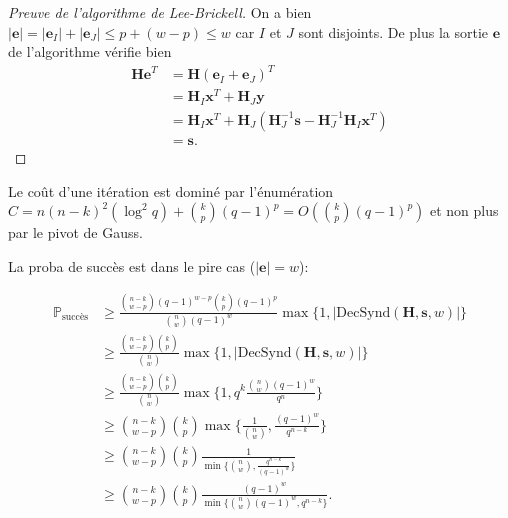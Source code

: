 \documentclass{scrartcl}[a4paper,9pt,headings=small,footinclude=false]
\theoremstyle{definition}
\theoremstyle{remark}
\begin{document}
\begin{proof}[Preuve de l'algorithme de Lee-Brickell]
On a bien $|\textbf{e}|=|\textbf{e}_I|+|\textbf{e}_J|\leq p + (w - p)\leq w$ car $I$ et $J$ sont disjoints.
De plus la sortie $\textbf{e}$ de l'algorithme vérifie bien
\begin{align*}
    \textbf{He}^T &= \textbf{H}(\textbf{e}_I+\textbf{e}_J)^T\\
    &= \textbf{H}_I \textbf{x}^T + \textbf{H}_J \textbf{y}\\
    &= \textbf{H}_I \textbf{x}^T + \textbf{H}_J (\textbf{H}_J^{-1}\textbf{s} - \textbf{H}_J^{-1}\textbf{H}_I\textbf{x}^T)\\
    &= \textbf{s}.
\end{align*}
\end{proof}

Le coût d'une itération est dominé par l'énumération $C=n(n-k)^2(\log^2 q) + \binom{k}{p}(q-1)^p=O(\binom{k}{p}(q-1)^p)$ et non plus par le pivot de Gauss. 


La proba de succès est dans le pire cas ($|\textbf{e}|=w$):

\begin{align*}
\mathbb{P}_{\text{succès}} &\geq  \frac{\binom{n-k}{w-p}(q-1)^{w-p} \binom{k}{p}(q-1)^{p}}{\binom{n}{w}(q-1)^w} \max \{ 1, |\text{DecSynd}(\textbf{H},\textbf{s},w)|\}\\
&\geq  \frac{\binom{n-k}{w-p} \binom{k}{p}}{\binom{n}{w}} \max \{ 1, |\text{DecSynd}(\textbf{H},\textbf{s},w)|\}\\
&\geq  \frac{\binom{n-k}{w-p} \binom{k}{p}}{\binom{n}{w}} \max \{ 1, q^k \frac{\binom{n}{w}(q-1)^w}{q^n}\}\\
&\geq  \binom{n-k}{w-p} \binom{k}{p} \max \{ \frac{1}{\binom{n}{w}}, \frac{(q-1)^w}{q^{n-k}}\}\\
&\geq  \binom{n-k}{w-p} \binom{k}{p} \frac{1}{\min \{ \binom{n}{w}, \frac{q^{n-k}}{(q-1)^w}\}}\\
&\geq  \binom{n-k}{w-p} \binom{k}{p} \frac{(q-1)^w}{\min \{ \binom{n}{w}(q-1)^w, q^{n-k}\}}.
\end{align*}
\end{document}
